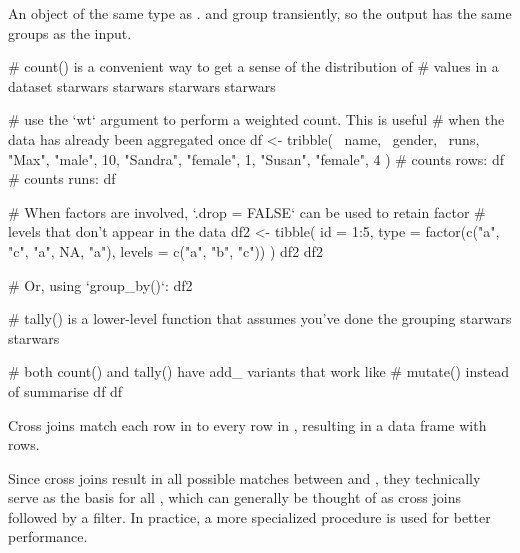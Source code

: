 \documentclass[a4paper]{book}
\begin{document}
%
\begin{Value}
An object of the same type as .  and 
group transiently, so the output has the same groups as the input.
\end{Value}
%
\begin{Examples}
\begin{ExampleCode}
# count() is a convenient way to get a sense of the distribution of
# values in a dataset
starwars %
starwars %
starwars %
starwars %

# use the `wt` argument to perform a weighted count. This is useful
# when the data has already been aggregated once
df <- tribble(
  ~name,    ~gender,   ~runs,
  "Max",    "male",       10,
  "Sandra", "female",      1,
  "Susan",  "female",      4
)
# counts rows:
df %
# counts runs:
df %

# When factors are involved, `.drop = FALSE` can be used to retain factor
# levels that don't appear in the data
df2 <- tibble(
  id = 1:5,
  type = factor(c("a", "c", "a", NA, "a"), levels = c("a", "b", "c"))
)
df2 %
df2 %

# Or, using `group_by()`:
df2 %

# tally() is a lower-level function that assumes you've done the grouping
starwars %
starwars %

# both count() and tally() have add_ variants that work like
# mutate() instead of summarise
df %
df %
\end{ExampleCode}
\end{Examples}
%
\begin{Description}
Cross joins match each row in  to every row in , resulting in a data
frame with  rows.

Since cross joins result in all possible matches between  and , they
technically serve as the basis for all , which
can generally be thought of as cross joins followed by a filter. In practice,
a more specialized procedure is used for better performance.
\end{Description}
\end{document}

